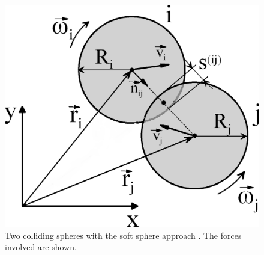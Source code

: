 \begin{figure}[!h]
\centering
\includegraphics[width=.6\columnwidth]{images/109twospheres}
\caption[Two spheres]{Two colliding spheres with the soft sphere approach
\cite{RefWorks:201}. The forces involved are shown.}
\label{fig:109twospheres}
\end{figure}